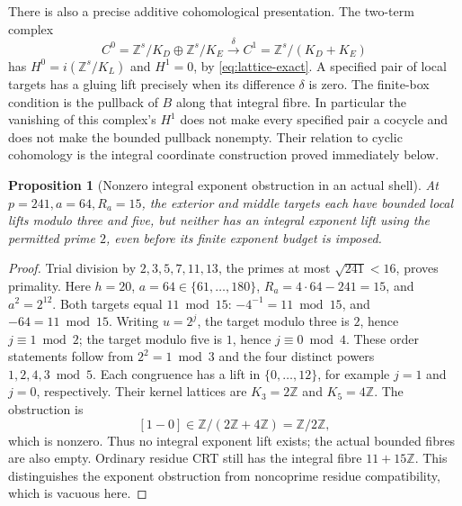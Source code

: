 \documentclass[11pt]{article}
\newtheorem{proposition}[theorem]{Proposition}
\theoremstyle{definition}\newtheorem{definition}[theorem]{Definition}
\theoremstyle{remark}\newtheorem{remark}[theorem]{Remark}
\newcommand{\Z}{\mathbb Z}\newcommand{\Q}{\mathbb Q}
\begin{document}
There is also a precise additive cohomological presentation.
The two-term complex
\[
 C^0=\Z^s/K_D\oplus\Z^s/K_E
       \xrightarrow{\delta}
 C^1=\Z^s/(K_D+K_E)
\]
has \(H^0=i(\Z^s/K_L)\) and \(H^1=0\), by
\eqref{eq:lattice-exact}.  A specified pair of local targets has
a gluing lift precisely when its difference \(\delta\) is zero.
The finite-box condition is the pullback of \(B\) along that
integral fibre.  In particular the vanishing of this complex's
\(H^1\) does not make every specified pair a cocycle and does not
make the bounded pullback nonempty. Their relation to cyclic
cohomology is the integral coordinate construction proved immediately below.


\begin{proposition}[Nonzero integral exponent obstruction in an actual shell]
\label{prop:nonzero-obstruction}
At \(p=241,a=64,R_a=15\), the exterior and middle targets each
have bounded local lifts modulo three and five, but neither
has an integral exponent lift using the permitted prime \(2\),
even before its finite exponent budget is imposed.
\end{proposition}
\begin{proof}
Trial division by \(2,3,5,7,11,13\), the primes at most
\(\sqrt{241}<16\), proves primality.  Here \(h=20\),
\(a=64\in\{61,\ldots,180\}\), \(R_a=4\cdot64-241=15\),
and \(a^2=2^{12}\).  Both targets equal \(11\bmod15\):
\(-4^{-1}=11\bmod15\), and \(-64=11\bmod15\).
Writing \(u=2^j\), the target modulo three is \(2\), hence
\(j\equiv1\bmod2\); the target modulo five is \(1\), hence
\(j\equiv0\bmod4\).  These order statements follow from
\(2^2=1\bmod3\) and the four distinct powers
\(1,2,4,3\bmod5\).
Each congruence has a lift in \(\{0,\ldots,12\}\),
for example \(j=1\) and \(j=0\), respectively.  Their
kernel lattices are \(K_3=2\Z\) and \(K_5=4\Z\).
The obstruction is
\[
 [1-0]\in\Z/(2\Z+4\Z)=\Z/2\Z,
\]
which is nonzero.  Thus no integral exponent lift exists;
the actual bounded fibres are also empty.  Ordinary
residue CRT still has the integral fibre \(11+15\Z\).
This distinguishes the exponent obstruction from
noncoprime residue compatibility, which is vacuous here.
\end{proof}
\end{document}
